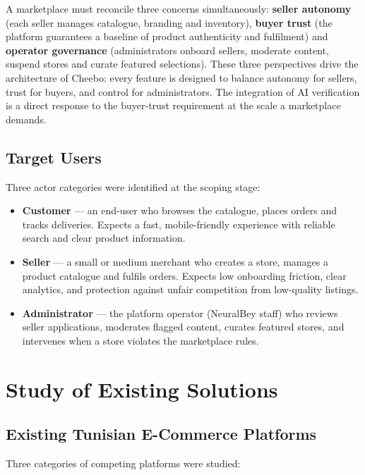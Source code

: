 \documentclass[12pt, a4paper, oneside]{report}
\begin{document}
A marketplace must reconcile three concerns simultaneously:
\textbf{seller autonomy} (each seller manages catalogue, branding and
inventory), \textbf{buyer trust} (the platform guarantees a baseline
of product authenticity and fulfilment) and \textbf{operator
governance} (administrators onboard sellers, moderate content, suspend
stores and curate featured selections). These three perspectives drive
the architecture of Cheebo: every feature is designed to balance
autonomy for sellers, trust for buyers, and control for administrators.
The integration of AI verification is a direct response to the
buyer-trust requirement at the scale a marketplace demands.

\subsection{Target Users}

Three actor categories were identified at the scoping stage:

\begin{itemize}[leftmargin=*,itemsep=4pt]
  \item \textbf{Customer} --- an end-user who browses the catalogue,
        places orders and tracks deliveries. Expects a fast,
        mobile-friendly experience with reliable search and clear
        product information.
  \item \textbf{Seller} --- a small or medium merchant who creates a
        store, manages a product catalogue and fulfils orders.
        Expects low onboarding friction, clear analytics, and
        protection against unfair competition from low-quality
        listings.
  \item \textbf{Administrator} --- the platform operator (NeuralBey
        staff) who reviews seller applications, moderates flagged
        content, curates featured stores, and intervenes when a store
        violates the marketplace rules.
\end{itemize}

\section{Study of Existing Solutions}

\subsection{Existing Tunisian E-Commerce Platforms}

Three categories of competing platforms were studied:
\end{document}
